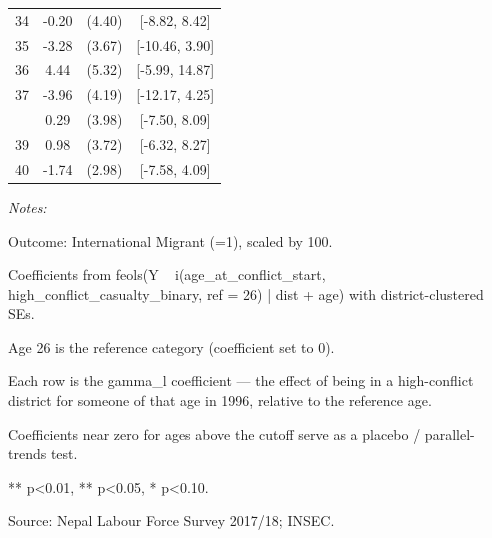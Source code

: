 \begin{table}[!h]
\begin{threeparttable}
\begin{tabular}[t]{cccc}
34 & -0.20 & (4.40) & {}[-8.82, 8.42]\\
35 & -3.28 & (3.67) & {}[-10.46, 3.90]\\
36 & 4.44 & (5.32) & {}[-5.99, 14.87]\\
37 & -3.96 & (4.19) & {}[-12.17, 4.25]\\
\addlinespace
38 & 0.29 & (3.98) & {}[-7.50, 8.09]\\
39 & 0.98 & (3.72) & {}[-6.32, 8.27]\\
40 & -1.74 & (2.98) & {}[-7.58, 4.09]\\
\bottomrule
\end{tabular}
\begin{tablenotes}
\item \textit{Notes:} 
\item Outcome: International Migrant (=1), scaled by 100.
\item Coefficients from feols(Y ~ i(age_at_conflict_start, high_conflict_casualty_binary, ref = 26) | dist + age) with district-clustered SEs.
\item Age 26 is the reference category (coefficient set to 0).
\item Each row is the gamma_l coefficient — the effect of being in a high-conflict district for someone of that age in 1996, relative to the reference age.
\item Coefficients near zero for ages above the cutoff serve as a placebo / parallel-trends test.
\item *** p<0.01, ** p<0.05, * p<0.10.
\item Source: Nepal Labour Force Survey 2017/18; INSEC.
\end{tablenotes}
\end{threeparttable}
\end{table}
